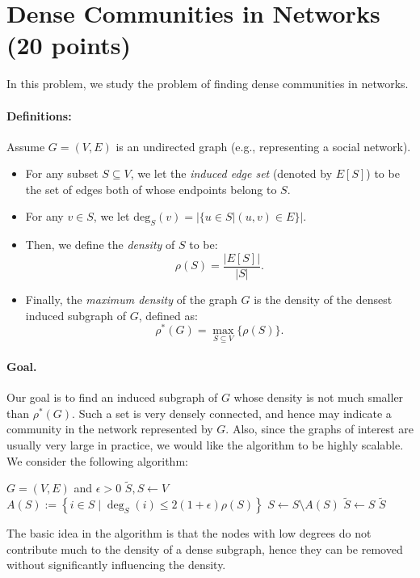 \section{Dense Communities in Networks (20 points)}

In this problem, we study the problem of finding dense communities in networks. 

\paragraph{Definitions:}
Assume $G=(V,E)$ is an undirected graph (e.g., representing a social network).
\begin{itemize}
  \item For any subset $S\subseteq V$, we let the \textit{induced edge set} (denoted by $E[S]$) to be the set of edges both of whose endpoints belong to $S$.
  \item For any $v\in S$, we let $\mbox{deg}_{S}(v)= |\{u\in S| (u,v)\in E\}|$.
  \item Then, we define the \textit{density} of $S$ to be:
	\[
		\rho(S) = \frac{|E[S]|}{|S|}.
	\]
  \item Finally, the \textit{maximum density} of the graph $G$ is the density of the densest induced subgraph of $G$, defined as:
	\[
		\rho^{*}(G) = \max_{S\subseteq V} \{\rho(S)\}.
	\]
\end{itemize}

\paragraph{Goal.} Our goal is to find an induced subgraph of $G$ whose density is not much smaller than $\rho^{*}(G)$. Such a set is very densely connected, and hence may indicate a community in the network represented by $G$. Also, since the graphs of interest are usually very large in practice, we would like the algorithm to be highly scalable. We consider the following algorithm:

\begin{algorithmic}
\REQUIRE $G = (V, E)$ and $\epsilon > 0$
\STATE $\tilde{S}, S\leftarrow V$
\STATE $A(S):=\left\{ i\in S \mid \deg_S(i) \leq 2(1+\epsilon)\rho (S) \right\} $
\STATE $S\leftarrow S \setminus A(S)$
\STATE $\tilde{S} \leftarrow S$
\ENDIF
\ENDWHILE
\RETURN $\tilde{S}$
\end{algorithmic}

The basic idea in the algorithm is that the nodes with low degrees do not contribute much to the density of a dense subgraph, hence they can be removed without significantly influencing the density.

